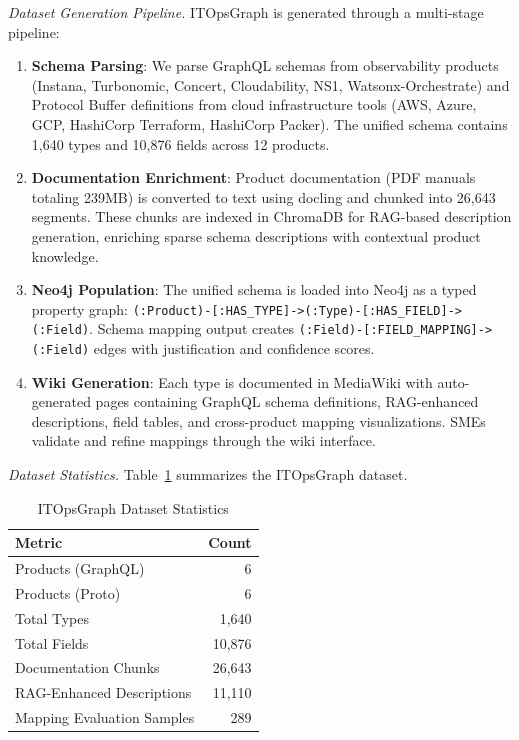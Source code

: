 \documentclass[sigconf, nonacm]{acmart}
\begin{document}
\textit{Dataset Generation Pipeline.} ITOpsGraph is generated through a multi-stage pipeline:

\begin{enumerate}
    \item \textbf{Schema Parsing}: We parse GraphQL schemas from observability products (Instana, Turbonomic, Concert, Cloudability, NS1, Watsonx-Orchestrate) and Protocol Buffer definitions from cloud infrastructure tools (AWS, Azure, GCP, HashiCorp Terraform, HashiCorp Packer). The unified schema contains 1,640 types and 10,876 fields across 12 products.

    \item \textbf{Documentation Enrichment}: Product documentation (PDF manuals totaling 239MB) is converted to text using docling and chunked into 26,643 segments. These chunks are indexed in ChromaDB for RAG-based description generation, enriching sparse schema descriptions with contextual product knowledge.

    \item \textbf{Neo4j Population}: The unified schema is loaded into Neo4j as a typed property graph: \texttt{(:Product)-[:HAS\_TYPE]->(:Type)-[:HAS\_FIELD]->(:Field)}. Schema mapping output creates \texttt{(:Field)-[:FIELD\_MAPPING]->(:Field)} edges with justification and confidence scores.

    \item \textbf{Wiki Generation}: Each type is documented in MediaWiki with auto-generated pages containing GraphQL schema definitions, RAG-enhanced descriptions, field tables, and cross-product mapping visualizations. SMEs validate and refine mappings through the wiki interface.
\end{enumerate}

\textit{Dataset Statistics.} Table~\ref{tab:itopsgraph_stats} summarizes the ITOpsGraph dataset.

\begin{table}[htbp]
\centering
\caption{ITOpsGraph Dataset Statistics}
\label{tab:itopsgraph_stats}
\begin{tabular}{lr}
\toprule
\textbf{Metric} & \textbf{Count} \\
\midrule
Products (GraphQL) & 6 \\
Products (Proto) & 6 \\
Total Types & 1,640 \\
Total Fields & 10,876 \\
Documentation Chunks & 26,643 \\
RAG-Enhanced Descriptions & 11,110 \\
Mapping Evaluation Samples & 289 \\
\bottomrule
\end{tabular}
\end{table}
\end{document}
